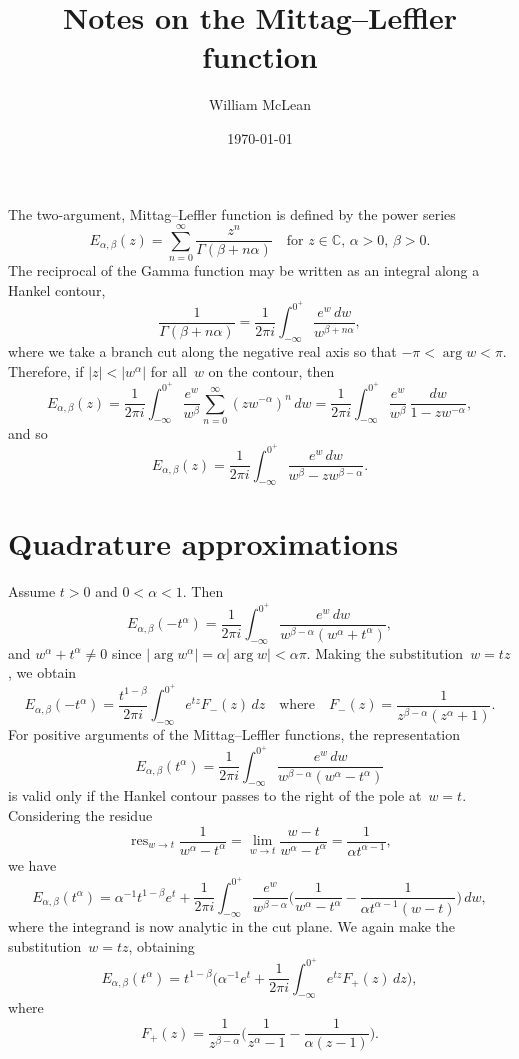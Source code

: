 \documentclass[12pt,a4paper]{article}
\title{Notes on the Mittag--Leffler function}
\author{William McLean}
\date{\today}
\DeclareMathOperator*{\res}{res}
\begin{document}
\maketitle
The two-argument, Mittag--Leffler function is defined by the power series
\begin{equation}\label{eq: E alpha beta def}
E_{\alpha,\beta}(z)=\sum_{n=0}^\infty\frac{z^n}{\Gamma(\beta+n\alpha)}
\quad\text{for $z\in\mathbb{C}$, $\alpha>0$, $\beta>0$.}
\end{equation}
The reciprocal of the Gamma function may be written as an integral along a
Hankel contour,
\[
\frac{1}{\Gamma(\beta+n\alpha)}=\frac{1}{2\pi i}\int_{-\infty}^{0^+}
    \frac{e^w\,dw}{w^{\beta+n\alpha}},
\]
where we take a branch cut along the negative real axis so that 
$-\pi<\arg w<\pi$. Therefore, if $|z|<|w^\alpha|$ for all~$w$ on the contour, 
then
\[
E_{\alpha,\beta}(z)=\frac{1}{2\pi i}\int_{-\infty}^{0^+}\frac{e^w}{w^\beta}
    \sum_{n=0}^\infty(zw^{-\alpha})^n\,dw
    =\frac{1}{2\pi i}\int_{-\infty}^{0^+}\frac{e^w}{w^\beta}\,
    \frac{dw}{1-zw^{-\alpha}},
\]
and so
\begin{equation}\label{eq: integral repn}
E_{\alpha,\beta}(z)=\frac{1}{2\pi i}\int_{-\infty}^{0^+}
    \frac{e^w\,dw}{w^\beta-zw^{\beta-\alpha}}.
\end{equation}
\section{Quadrature approximations}
Assume $t>0$ and $0<\alpha<1$.  Then
\[
E_{\alpha,\beta}(-t^\alpha)=\frac{1}{2\pi i}\int_{-\infty}^{0^+}
    \frac{e^w\,dw}{w^{\beta-\alpha}(w^\alpha+t^\alpha)},
\]
and $w^\alpha+t^\alpha\ne0$ since $|\arg w^\alpha|=\alpha|\arg w|<\alpha\pi$.  
Making the substitution~$w=tz$, we obtain
\[
E_{\alpha,\beta}(-t^\alpha)=\frac{t^{1-\beta}}{2\pi i}\int_{-\infty}^{0^+}
    e^{tz}F_-(z)\,dz
\quad\text{where}\quad F_-(z)=\frac{1}{z^{\beta-\alpha}(z^\alpha+1)}.
\]
For positive arguments of the Mittag--Leffler functions, the representation
\[
E_{\alpha,\beta}(t^\alpha)=\frac{1}{2\pi i}\int_{-\infty}^{0^+}
    \frac{e^w\,dw}{w^{\beta-\alpha}(w^\alpha-t^\alpha)}
\]
is valid only if the Hankel contour passes to the right of the pole 
at~$w=t$.  Considering the residue
\[
\res_{w\to t}\frac{1}{w^\alpha-t^\alpha}
    =\lim_{w\to t}\frac{w-t}{w^\alpha-t^\alpha}
    =\frac{1}{\alpha t^{\alpha-1}},
\]
we have
\[
E_{\alpha,\beta}(t^\alpha)=\alpha^{-1}t^{1-\beta}e^t
    +\frac{1}{2\pi i}\int_{-\infty}^{0^+}\frac{e^w}{w^{\beta-\alpha}}
    \biggl(\frac{1}{w^\alpha-t^\alpha}
    -\frac{1}{\alpha t^{\alpha-1}(w-t)}\biggr)\,dw,
\]
where the integrand is now analytic in the cut plane.  We again make the 
substitution~$w=tz$, obtaining
\[
E_{\alpha,\beta}(t^\alpha)=t^{1-\beta}\biggl(\alpha^{-1}e^t
    +\frac{1}{2\pi i}\int_{-\infty}^{0^+}e^{tz}F_+(z)\,dz\biggr),
\]
where
\[
F_+(z)=\frac{1}{z^{\beta-\alpha}}\biggl(\frac{1}{z^\alpha-1}
    -\frac{1}{\alpha(z-1)}\biggr).
\]
\end{document}
